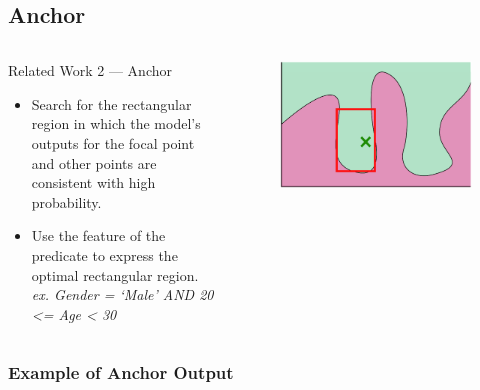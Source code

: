 \documentclass[aspectratio=169]{slide-en}
\begin{document}
\subsection{Anchor}

\begin{frame}{}
  \begin{columns}[]
    \begin{column}{0.5\textwidth}
      Related Work 2 — Anchor
      \begin{itemize}
        \item Search for the rectangular region in which the model's outputs
              for the focal point and other points are consistent with high
              probability.
        \item Use the feature of the predicate to express the optimal
              rectangular region. \\
              \textit{\footnotesize{ex. Gender = ‘Male’ AND 20 <= Age < 30}}
      \end{itemize}

      \bigskip
    \end{column}
    \begin{column}{0.5\textwidth}
      \begin{figure}
        \includegraphics[scale=0.35]{img/visual-anchor}
      \end{figure}
    \end{column}
  \end{columns}
\end{frame}

\subsubsection{Example of Anchor Output}
\end{document}
